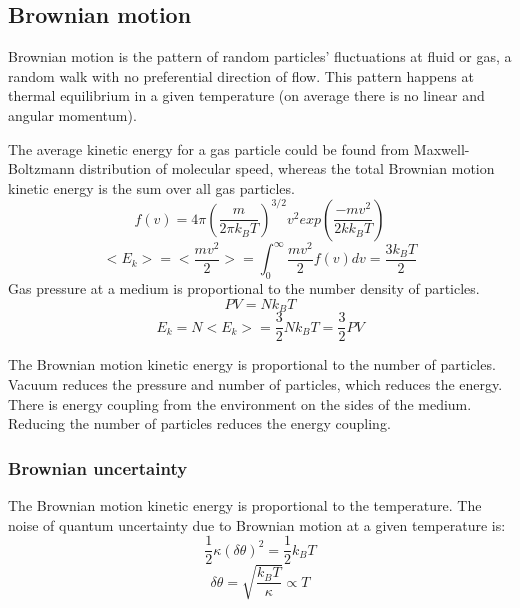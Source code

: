 \documentclass[\main/master.tex]{subfiles}
\begin{document}
\subsection{Brownian motion}
Brownian motion is the pattern of random particles' fluctuations at fluid or gas, a random walk with no preferential direction of flow. This pattern happens at thermal equilibrium in a given temperature (on average there is no linear and angular momentum). 
\par\noindent
The average kinetic energy for a gas particle could be found from Maxwell-Boltzmann distribution of molecular speed, whereas the total Brownian motion kinetic energy is the sum over all gas particles.
\begin{equation}
f(v) = 4\pi(\frac{m}{2\pi k_BT})^{3/2}v^2exp(\frac{-mv^2}{2kk_BT})     \label{eqn:Maxwell_Boltzmann}
\end{equation}  
\begin{equation}
<E_k>=<\frac{mv^2}{2}> = \int_{0}^{\infty}\frac{mv^2}{2}f(v)dv =  \frac{3k_BT}{2}    \label{eqn:average_kinetic}
\end{equation}
Gas pressure at a medium is proportional to the number density of particles.    
\begin{equation}
PV = N k_B T  \label{eqn:ideal-gasses}
\end{equation}
\begin{equation}
E_k=N<E_k> =\frac{3}{2}N k_B T = \frac{3}{2}PV    \label{eqn:total_kinetic}
\end{equation}

\noindent
The Brownian motion kinetic energy is proportional to the number of particles. Vacuum reduces the pressure and number of particles, which reduces the energy. There is energy coupling from the environment on the sides of the medium. Reducing the number of particles reduces the energy coupling.
\subsubsection{Brownian uncertainty}
The Brownian motion kinetic energy is proportional to the temperature. The noise of quantum uncertainty due to Brownian motion at a given temperature is: 
\begin{equation}
\frac{1}{2}\kappa (\delta\theta)^2= \frac{1}{2}k_BT  \label{eqn:radiation force}
\end{equation}
\begin{equation}
\delta\theta = \sqrt{\frac{k_BT}{\kappa}}\propto{T}  \label{eqn:radiation force}
\end{equation}
\end{document}
